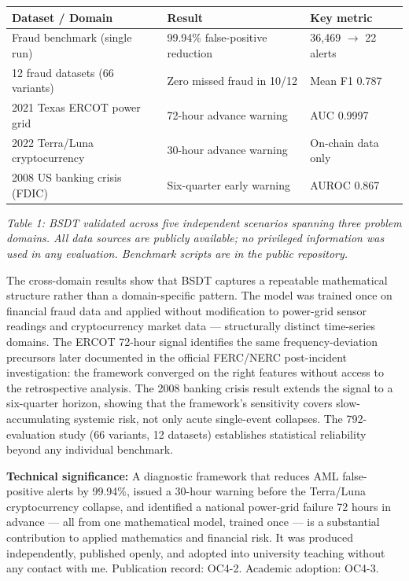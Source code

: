 \documentclass[11pt,a4paper]{article}
\begin{document}
\vspace{0.1cm}
\begin{center}
\small
\begin{tabular}{|p{4.5cm}|p{4.5cm}|p{4cm}|}
\hline
\textbf{Dataset / Domain} & \textbf{Result} & \textbf{Key metric} \\
\hline
Fraud benchmark (single run) & 99.94\% false-positive reduction & 36,469 $\to$ 22 alerts \\
\hline
12 fraud datasets (66 variants) & Zero missed fraud in 10/12 & Mean F1 0.787 \\
\hline
2021 Texas ERCOT power grid & 72-hour advance warning & AUC 0.9997 \\
\hline
2022 Terra/Luna cryptocurrency & 30-hour advance warning & On-chain data only \\
\hline
2008 US banking crisis (FDIC) & Six-quarter early warning & AUROC 0.867 \\
\hline
\end{tabular}
\end{center}
\vspace{0.15cm}
\noindent\textit{\small Table 1: BSDT validated across five independent scenarios spanning three problem domains. All data sources are publicly available; no privileged information was used in any evaluation. Benchmark scripts are in the public repository.}

\vspace{0.25cm}
\noindent The cross-domain results show that BSDT captures a repeatable mathematical structure rather than a domain-specific pattern. The model was trained once on financial fraud data and applied without modification to power-grid sensor readings and cryptocurrency market data --- structurally distinct time-series domains. The ERCOT 72-hour signal identifies the same frequency-deviation precursors later documented in the official FERC/NERC post-incident investigation: the framework converged on the right features without access to the retrospective analysis. The 2008 banking crisis result extends the signal to a six-quarter horizon, showing that the framework's sensitivity covers slow-accumulating systemic risk, not only acute single-event collapses. The 792-evaluation study (66 variants, 12 datasets) establishes statistical reliability beyond any individual benchmark.

\vspace{0.2cm}
\noindent\textbf{Technical significance:} A diagnostic framework that reduces AML false-positive alerts by 99.94\%, issued a 30-hour warning before the Terra/Luna cryptocurrency collapse, and identified a national power-grid failure 72 hours in advance --- all from one mathematical model, trained once --- is a substantial contribution to applied mathematics and financial risk. It was produced independently, published openly, and adopted into university teaching without any contact with me. Publication record: OC4-2. Academic adoption: OC4-3.
\end{document}
